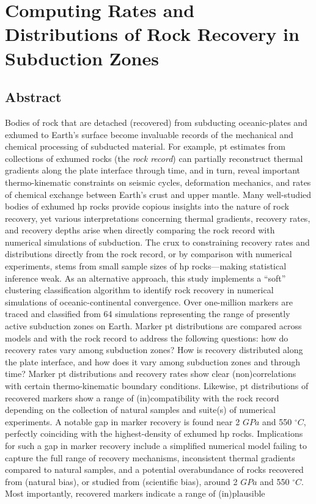 \cleardoublepage

\hypertarget{chpt4}{%
\chapter{Computing Rates and Distributions of Rock Recovery in Subduction Zones}\label{chpt4}}


\hypertarget{chpt4Abstract}{%
\section{Abstract}\label{chpt4Abstract}}

Bodies of rock that are detached (recovered) from subducting oceanic-plates and exhumed to Earth's surface become invaluable records of the mechanical and chemical processing of subducted material. For example, \gls{pt} estimates from collections of exhumed  rocks (the \emph{rock record}) can partially reconstruct thermal gradients along the plate interface through time, and in turn, reveal important thermo-kinematic constraints on seismic cycles, deformation mechanics, and rates of chemical exchange between Earth's crust and upper mantle. Many well-studied bodies of exhumed \gls{hp} rocks provide copious insights into the nature of rock recovery, yet various interpretations concerning thermal gradients, recovery rates, and recovery depths arise when directly comparing the rock record with numerical simulations of subduction. The crux to constraining recovery rates and distributions directly from the rock record, or by comparison with numerical experiments, stems from small sample sizes of \gls{hp} rocks---making statistical inference weak. As an alternative approach, this study implements a ``soft'' clustering classification algorithm to identify rock recovery in numerical simulations of oceanic-continental convergence. Over one-million markers are traced and classified from 64 simulations representing the range of presently active subduction zones on Earth. Marker \gls{pt} distributions are compared across models and with the rock record to address the following questions: how do recovery rates vary among subduction zones? How is recovery distributed along the plate interface, and how does it vary among subduction zones and through time? Marker \gls{pt} distributions and recovery rates show clear (non)correlations with certain thermo-kinematic boundary conditions. Likewise, \gls{pt} distributions of recovered markers show a range of (in)compatibility with the rock record depending on the collection of natural samples and suite(s) of numerical experiments. A notable gap in marker recovery is found near 2 \(GPa\) and 550 \(^\circ C\), perfectly coinciding with the highest-density of exhumed \gls{hp} rocks. Implications for such a gap in marker recovery include a simplified numerical model failing to capture the full range of recovery mechanisms, inconsistent thermal gradients compared to natural samples, and a potential overabundance of rocks recovered from (natural bias), or studied from (scientific bias), around 2 \(GPa\) and 550 \(^\circ C\). Most importantly, recovered markers indicate a range of (in)plausible 